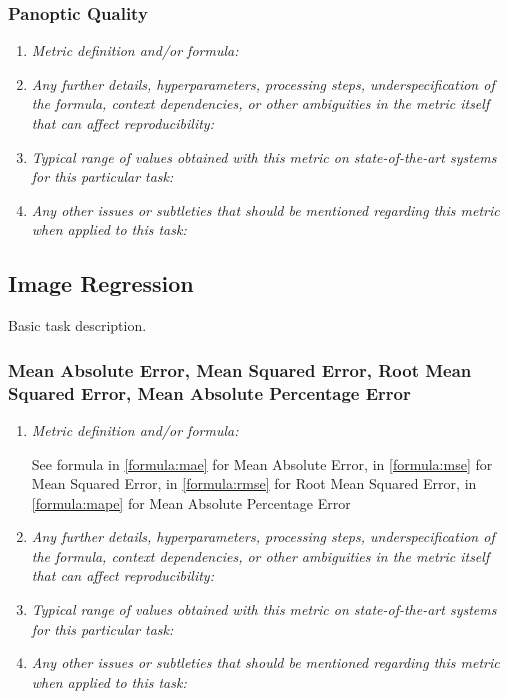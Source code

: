 \documentclass[a4paper,11pt]{article}
\begin{document}
        \subsubsection{Panoptic Quality}
            \begin{enumerate}[label=\alph*.]
                \item \textit{Metric definition and/or formula:}
                \bigskip
                \item \textit{Any further details, hyperparameters, processing steps, underspecification of the formula, context dependencies, or other ambiguities in the metric itself that can affect reproducibility:}
                \bigskip
                \item \textit{Typical range of values obtained with this metric on state-of-the-art systems for this particular task:}
                \bigskip
                \item \textit{Any other issues or subtleties that should be mentioned regarding this metric when applied to this task:}
                \bigskip
            \end{enumerate}

    \subsection{Image Regression}
        Basic task description.
        \subsubsection{Mean Absolute Error, Mean Squared Error, Root Mean Squared Error, Mean Absolute Percentage Error}
            \begin{enumerate}[label=\alph*.]
                \item \textit{Metric definition and/or formula:}

                See formula in \ref{formula:mae} for Mean Absolute Error, in \ref{formula:mse} for Mean Squared Error, in \ref{formula:rmse} for Root Mean Squared Error, in \ref{formula:mape} for Mean Absolute Percentage Error
                \bigskip
                \item \textit{Any further details, hyperparameters, processing steps, underspecification of the formula, context dependencies, or other ambiguities in the metric itself that can affect reproducibility:}
                \bigskip
                \item \textit{Typical range of values obtained with this metric on state-of-the-art systems for this particular task:}
                \bigskip
                \item \textit{Any other issues or subtleties that should be mentioned regarding this metric when applied to this task:}
                \bigskip
            \end{enumerate}
\end{document}
